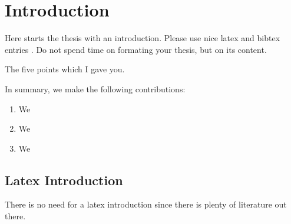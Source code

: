 \chapter{Introduction}
\label{chapter:Introduction}



Here starts the thesis with an introduction. Please use nice latex and bibtex entries \cite{latex}. Do not spend time on formating your thesis, but on its content. 

The five points which I gave you.

In summary, we make the following contributions:
\begin{enumerate}
 \item We
 
 \item We
 
 \item We
 
\end{enumerate}

\section{Latex Introduction}
There is no need for a latex introduction since there is plenty of literature out there.
 


